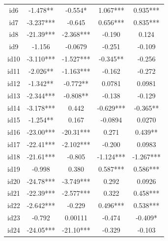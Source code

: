 \documentclass[num-refs]{wiley-article}
\begin{document}
\begin{center}
\begin{longtable}{ccccc}
id6                      & -1.478**  & -0.554*        & 1.067***          & 0.935***          \\
id7                      & -3.237*** & -0.645         & 0.656***          & 0.835***          \\
id8                      & -21.39*** & -2.368***      & -0.190            & 0.124             \\
id9                      & -1.156    & -0.0679        & -0.251            & -0.109            \\
id10                     & -3.110*** & -1.527***      & -0.345**          & -0.256            \\
id11                     & -2.026**  & -1.163***      & -0.162            & -0.272            \\
id12                     & -1.342**  & -0.772**       & 0.0781            & 0.0981            \\
id13                     & -2.344*** & -0.808**       & -0.138            & -0.129            \\
id14                     & -3.178*** & 0.442          & -0.629***         & -0.365**          \\
id15                     & -1.254**  & 0.167          & -0.0894           & 0.0270            \\
id16                     & -23.00*** & -20.31***      & 0.271             & 0.439**           \\
id17                     & -22.41*** & -2.102***      & -0.200            & 0.0983            \\
id18                     & -21.61*** & -0.805         & -1.124***         & -1.267***         \\
id19                     & -0.998    & 0.380          & 0.587***          & 0.586***          \\
id20                     & -24.78*** & -3.749***      & 0.292             & 0.0926            \\
id21                     & -22.39*** & -2.577***      & 0.322             & 0.458***          \\
id22                     & -2.642*** & -0.229         & 0.496***          & 0.538***          \\
id23                     & -0.792    & 0.00111        & -0.474            & -0.409*           \\
id24                     & -24.05*** & -21.10***      & -0.329            & -0.103            \\

\end{longtable}
\end{center}
\end{document}
